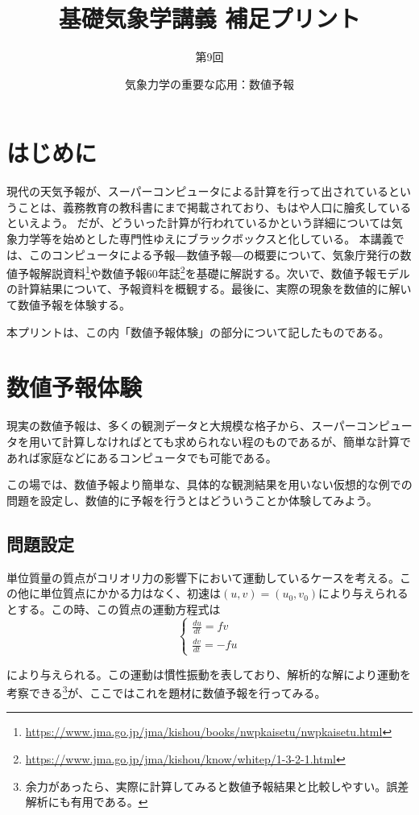\documentclass{jsarticle}
\begin{document}
\title{基礎気象学講義 補足プリント} %
\author{第9回} %
\date{気象力学の重要な応用：数値予報} %
\maketitle

\section{はじめに}
現代の天気予報が、スーパーコンピュータによる計算を行って出されているということは、義務教育の教科書にまで掲載されており、もはや人口に膾炙しているといえよう。
だが、どういった計算が行われているかという詳細については気象力学等を始めとした専門性ゆえにブラックボックスと化している。
本講義では、このコンピュータによる予報―数値予報―の概要について、気象庁発行の数値予報解説資料\footnote{\url{https://www.jma.go.jp/jma/kishou/books/nwpkaisetu/nwpkaisetu.html}}や数値予報60年誌\footnote{\url{https://www.jma.go.jp/jma/kishou/know/whitep/1-3-2-1.html}}を基礎に解説する。次いで、数値予報モデルの計算結果について、予報資料を概観する。最後に、実際の現象を数値的に解いて数値予報を体験する。

本プリントは、この内「数値予報体験」の部分について記したものである。

\section{数値予報体験}
現実の数値予報は、多くの観測データと大規模な格子から、スーパーコンピュータを用いて計算しなければとても求められない程のものであるが、簡単な計算であれば家庭などにあるコンピュータでも可能である。

この場では、数値予報より簡単な、具体的な観測結果を用いない仮想的な例での問題を設定し、数値的に予報を行うとはどういうことか体験してみよう。

\subsection{問題設定}
単位質量の質点がコリオリ力の影響下において運動しているケースを考える。この他に単位質点にかかる力はなく、初速は$(u,v)=(u_0,v_0)$により与えられるとする。この時、この質点の運動方程式は
\[
\left\{
\begin{array}{l}
\frac{du}{dt}=fv \\
\frac{dv}{dt}=-fu
\end{array}
\right.
\]

により与えられる。この運動は慣性振動を表しており、解析的な解により運動を考察できる\footnote{余力があったら、実際に計算してみると数値予報結果と比較しやすい。誤差解析にも有用である。}が、ここではこれを題材に数値予報を行ってみる。
\end{document}
